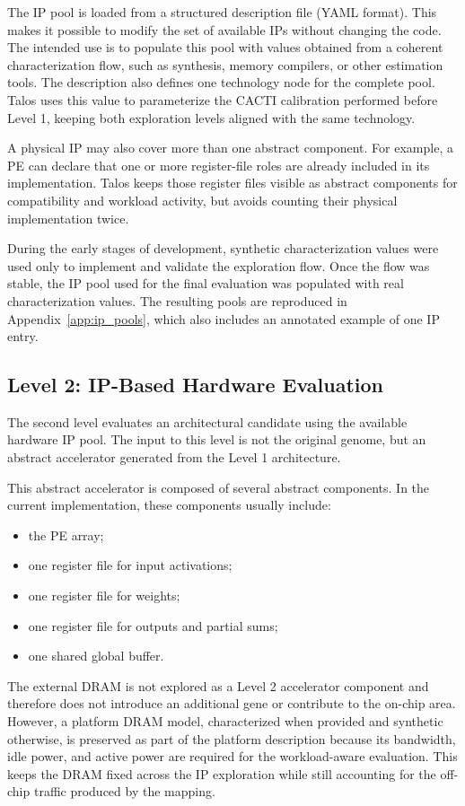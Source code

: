 The IP pool is loaded from a structured description file (YAML format). This makes
it possible to modify the set of available IPs without changing the
code. The intended use is to populate this pool with values obtained
from a coherent characterization flow, such as synthesis, memory
compilers, or other estimation tools. The description also defines one
technology node for the complete pool. Talos uses this value to
parameterize the CACTI calibration performed before Level 1, keeping
both exploration levels aligned with the same technology.

A physical IP may also cover more than one abstract component. For
example, a PE can declare that one or more register-file roles are
already included in its implementation. Talos keeps those register
files visible as abstract components for compatibility and workload
activity, but avoids counting their physical implementation twice.

During the early stages of development, synthetic characterization
values were used only to implement and validate the exploration flow.
Once the flow was stable, the IP pool used for the final evaluation
was populated with real characterization values. The resulting pools
are reproduced in Appendix~\ref{app:ip_pools}, which also includes an
annotated example of one IP entry.

\subsection{Level 2: IP-Based Hardware Evaluation}
The second level evaluates an architectural candidate using the
available hardware IP pool. The input to this level is not the
original genome, but an abstract accelerator generated from the Level
1 architecture.

This abstract accelerator is composed of several abstract components.
In the current implementation, these components usually include:

\begin{itemize}
\item the PE array;
\item one register file for input activations;
\item one register file for weights;
\item one register file for outputs and partial sums;
\item one shared global buffer.
\end{itemize}

The external DRAM is not explored as a Level 2 accelerator component
and therefore does not introduce an additional gene or contribute to
the on-chip area. However, a platform DRAM model, characterized when
provided and synthetic otherwise, is preserved as part of the platform
description because its bandwidth, idle power, and active power are
required for the workload-aware evaluation. This keeps the DRAM fixed
across the IP exploration while still accounting for the off-chip
traffic produced by the mapping.

